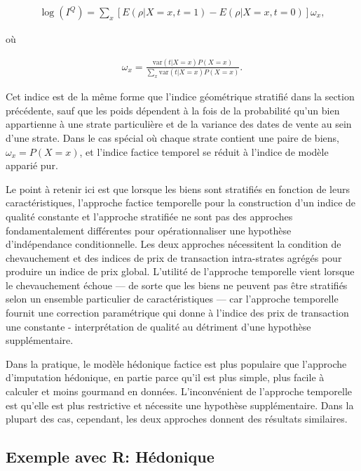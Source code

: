 \documentclass[
]{article}
\begin{document}
\begin{align*}
\log (I^{Q}) = \sum_{x} [E(\rho | X = x, t = 1) - E(\rho | X = x, t = 0)] \omega_{x},
\end{align*}

où

\begin{align*}
\omega_{x} = \frac{\text{var}(t | X = x) P(X = x)}{\sum_{x} \text{var}(t | X = x) P(X = x)}.
\end{align*}

Cet indice est de la même forme que l'indice géométrique stratifié dans la section précédente, sauf que les poids dépendent à la fois de la probabilité qu'un bien appartienne à une strate particulière et de la variance des dates de vente au sein d'une strate. Dans le cas spécial où chaque strate contient une paire de biens, \(\omega_{x} = P(X = x)\), et l'indice factice temporel se réduit à l'indice de modèle apparié pur.

Le point à retenir ici est que lorsque les biens sont stratifiés en fonction de leurs caractéristiques, l'approche factice temporelle pour la construction d'un indice de qualité constante et l'approche stratifiée ne sont pas des approches fondamentalement différentes pour opérationnaliser une hypothèse d'indépendance conditionnelle. Les deux approches nécessitent la condition de chevauchement et des indices de prix de transaction intra-strates agrégés pour produire un indice de prix global. L'utilité de l'approche temporelle vient lorsque le chevauchement échoue --- de sorte que les biens ne peuvent pas être stratifiés selon un ensemble particulier de caractéristiques --- car l'approche temporelle fournit une correction paramétrique qui donne à l'indice des prix de transaction une constante - interprétation de qualité au détriment d'une hypothèse supplémentaire.

Dans la pratique, le modèle hédonique factice est plus populaire que l'approche d'imputation hédonique, en partie parce qu'il est plus simple, plus facile à calculer et moins gourmand en données. L'inconvénient de l'approche temporelle est qu'elle est plus restrictive et nécessite une hypothèse supplémentaire. Dans la plupart des cas, cependant, les deux approches donnent des résultats similaires.

\hypertarget{exemple-avec-r-huxe9donique}{%
\subsection{Exemple avec R: Hédonique}\label{exemple-avec-r-huxe9donique}}
\end{document}
